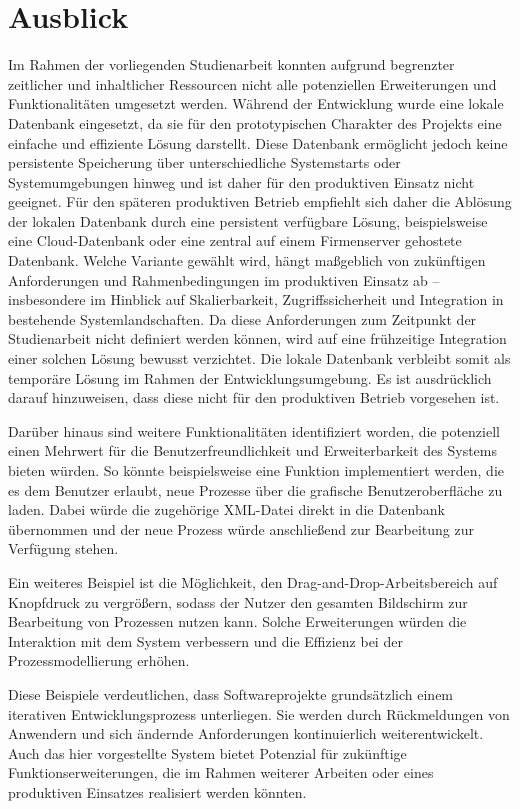 \newpage
\section*{Ausblick}
Im Rahmen der vorliegenden Studienarbeit konnten aufgrund begrenzter zeitlicher und inhaltlicher Ressourcen nicht alle potenziellen Erweiterungen und Funktionalitäten umgesetzt werden. Während der Entwicklung wurde eine lokale Datenbank eingesetzt, da sie für den prototypischen Charakter des Projekts eine einfache und effiziente Lösung darstellt. Diese Datenbank ermöglicht jedoch keine persistente Speicherung über unterschiedliche Systemstarts oder Systemumgebungen hinweg und ist daher für den produktiven Einsatz nicht geeignet.
Für den späteren produktiven Betrieb empfiehlt sich daher die Ablösung der lokalen Datenbank durch eine persistent verfügbare Lösung, beispielsweise eine Cloud-Datenbank oder eine zentral auf einem Firmenserver gehostete Datenbank. Welche Variante gewählt wird, hängt maßgeblich von zukünftigen Anforderungen und Rahmenbedingungen im produktiven Einsatz ab – insbesondere im Hinblick auf Skalierbarkeit, Zugriffssicherheit und Integration in bestehende Systemlandschaften. Da diese Anforderungen zum Zeitpunkt der Studienarbeit nicht definiert werden können, wird auf eine frühzeitige Integration einer solchen Lösung bewusst verzichtet. Die lokale Datenbank verbleibt somit als temporäre Lösung im Rahmen der Entwicklungsumgebung. Es ist ausdrücklich darauf hinzuweisen, dass diese nicht für den produktiven Betrieb vorgesehen ist.

Darüber hinaus sind weitere Funktionalitäten identifiziert worden, die potenziell einen Mehrwert für die Benutzerfreundlichkeit und Erweiterbarkeit des Systems bieten würden. So könnte beispielsweise eine Funktion implementiert werden, die es dem Benutzer erlaubt, neue Prozesse über die grafische Benutzeroberfläche zu laden. Dabei würde die zugehörige XML-Datei direkt in die Datenbank übernommen und der neue Prozess würde anschließend zur Bearbeitung zur Verfügung stehen.

Ein weiteres Beispiel ist die Möglichkeit, den Drag-and-Drop-Arbeitsbereich auf Knopfdruck zu vergrößern, sodass der Nutzer den gesamten Bildschirm zur Bearbeitung von Prozessen nutzen kann. Solche Erweiterungen würden die Interaktion mit dem System verbessern und die Effizienz bei der Prozessmodellierung erhöhen.

Diese Beispiele verdeutlichen, dass Softwareprojekte grundsätzlich einem iterativen Entwicklungsprozess unterliegen. Sie werden durch Rückmeldungen von Anwendern und sich ändernde Anforderungen kontinuierlich weiterentwickelt. Auch das hier vorgestellte System bietet Potenzial für zukünftige Funktionserweiterungen, die im Rahmen weiterer Arbeiten oder eines produktiven Einsatzes realisiert werden könnten.




